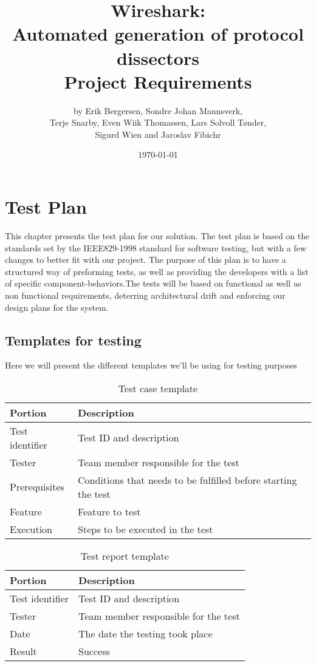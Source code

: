 \documentclass[a4paper, 11pt]{report}
\title{Wireshark:\\ Automated generation of protocol dissectors\\
		Project Requirements}
\author{by Erik Bergersen, Sondre Johan Mannsverk,\\ Terje Snarby,
		Even Wiik Thomassen, Lars Solvoll Tønder,\\ Sigurd Wien
		and Jaroslav Fibichr}
\date{\today}
\begin{document}
\chapter{Test Plan}

This chapter presents the test plan for our solution. The test plan is based on  the standards set by the IEEE829-1998 standard for software testing, but with a few changes to better fit with our project. The purpose of this plan is to have a structured way of preforming tests, as well as providing the developers with a list of specific component-behaviors.The tests will be based on functional as well as non functional requirements, deterring architectural drift and enforcing our design plans for the system.

\section{Templates for testing}

Here we will present the different templates we'll be using for testing purposes\\

\begin{table}[H]
\caption{Test case template}
\begin{tabular}{l l}
\hline\hline
Portion & Description\\[0.5ex]
\hline
Test identifier & Test ID and description\\[0.5ex]
Tester & Team member responsible for the test\\[0.5ex]
Prerequisites & Conditions that needs to be fulfilled before starting the test\\[0.5ex]
Feature & Feature to test\\[0.5ex]
Execution & Steps to be executed in the test\\[0.5ex]
\hline\hline
\end{tabular}
\end{table}

\begin{table}[H]
\caption{Test report template}
\begin{tabular}{l l}
\hline\hline
Portion & Description\\[0.5ex]
\hline
Test identifier & Test ID and description\\[0.5ex]
Tester & Team member responsible for the test\\[0.5ex]
Date & The date the testing took place\\[0.5ex]
Result & Success \\[0.5ex]
\hline\hline
\end{tabular}
\end{table}
\end{document}
